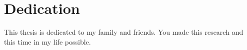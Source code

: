 \section*{Dedication}
\label{sec:dedication}

This thesis is dedicated to my family and friends. You made this
research and this time in my life possible.

